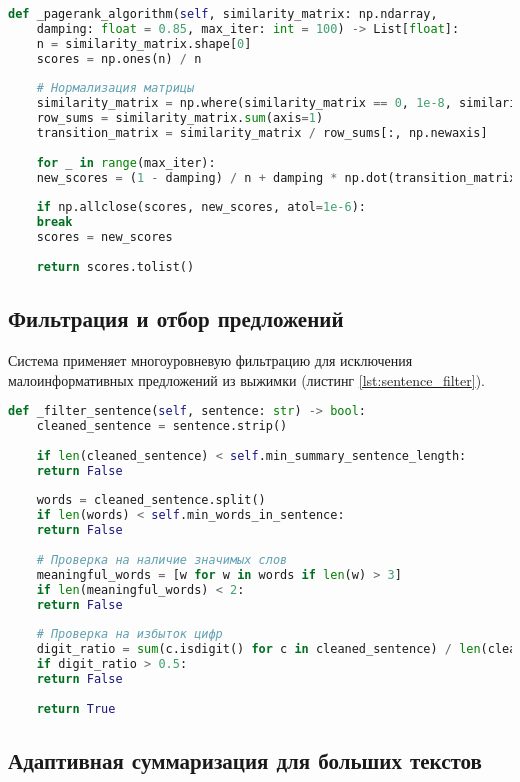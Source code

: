 \begin{lstlisting}[language=Python,caption={Упрощенный алгоритм PageRank для предложений},label=lst:textrank]
	def _pagerank_algorithm(self, similarity_matrix: np.ndarray, 
	damping: float = 0.85, max_iter: int = 100) -> List[float]:
	n = similarity_matrix.shape[0]
	scores = np.ones(n) / n
	
	# Нормализация матрицы
	similarity_matrix = np.where(similarity_matrix == 0, 1e-8, similarity_matrix)
	row_sums = similarity_matrix.sum(axis=1)
	transition_matrix = similarity_matrix / row_sums[:, np.newaxis]
	
	for _ in range(max_iter):
	new_scores = (1 - damping) / n + damping * np.dot(transition_matrix.T, scores)
	
	if np.allclose(scores, new_scores, atol=1e-6):
	break
	scores = new_scores
	
	return scores.tolist()
\end{lstlisting}

\subsection{Фильтрация и отбор предложений}

Система применяет многоуровневую фильтрацию для исключения малоинформативных предложений из выжимки (листинг \ref{lst:sentence_filter}).
\clearpage

\begin{lstlisting}[language=Python,caption={Фильтрация предложений для суммаризации},label=lst:sentence_filter]
	def _filter_sentence(self, sentence: str) -> bool:
	cleaned_sentence = sentence.strip()
	
	if len(cleaned_sentence) < self.min_summary_sentence_length:
	return False
	
	words = cleaned_sentence.split()
	if len(words) < self.min_words_in_sentence:
	return False
	
	# Проверка на наличие значимых слов
	meaningful_words = [w for w in words if len(w) > 3]
	if len(meaningful_words) < 2:
	return False
	
	# Проверка на избыток цифр
	digit_ratio = sum(c.isdigit() for c in cleaned_sentence) / len(cleaned_sentence)
	if digit_ratio > 0.5:
	return False
	
	return True
\end{lstlisting}

\subsection{Адаптивная суммаризация для больших текстов}

